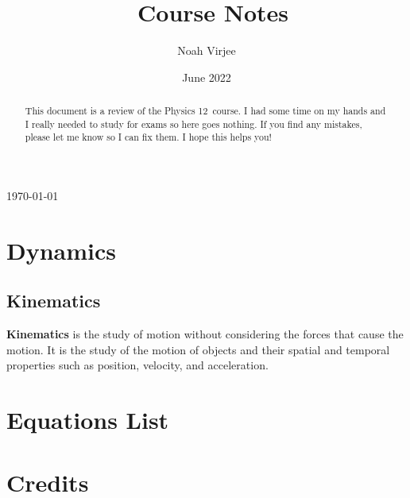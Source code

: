 \documentclass{article}
\title{\code\ Course Notes}
\author{Noah Virjee}
\date{June 2022}
\newcommand{\boldindex}[1]{\textbf{#1}\index{#1}} %
\newcommand{\name}{Physics 12}
\begin{document}
\noindent\parbox{\linewidth}{ %
\parbox{.7\linewidth}{\fontsize{24}{28}\selectfont\thetitle}\hfill%
\parbox{.3\linewidth}{\fontsize{12}{14}\selectfont\raggedleft\today\\\theauthor%
}}

\begin{abstract}
This document is a review of the \name\ course. I had some time on my hands and I really needed to study for exams so here goes nothing. If you find any mistakes, please let me know so I can fix them. I hope this helps you!
\end{abstract}

\tableofcontents
\pagebreak

\section{Dynamics}

\subsection{Kinematics}
\boldindex{Kinematics} is the study of motion without considering the forces that cause the motion. It is the study of the motion of objects and their spatial and temporal properties such as position, velocity, and acceleration.



\pagebreak
\appendix
\section*{Equations List}
%


\pagebreak
\printindex

\pagebreak
\section*{Credits}
%
\end{document}
